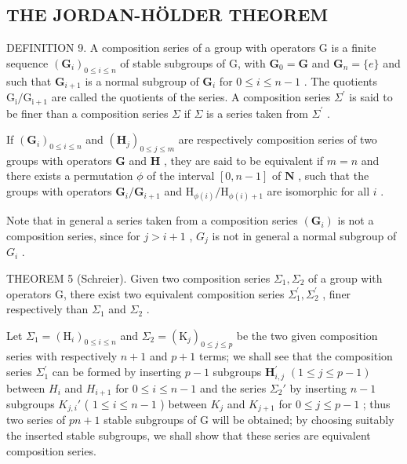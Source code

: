 \subsection{THE JORDAN-HÖLDER THEOREM}

DEFINITION 9. A composition series of a group with operators G is a finite sequence \((\mathbf{G}_i)_{0\leqslant i\leqslant n}\) of stable subgroups of G, with \(\mathbf{G}_0 = \mathbf{G}\) and \(\mathbf{G}_n = \{e\}\) and such that \(\mathbf{G}_{i + 1}\) is a normal subgroup of \(\mathbf{G}_i\) for \(0\leqslant i\leqslant n - 1\) . The quotients \(\mathrm{G_i / G_{i + 1}}\) are called the quotients of the series. A composition series \(\Sigma^{\prime}\) is said to be finer than a composition series \(\Sigma\) if \(\Sigma\) is a series taken from \(\Sigma^{\prime}\) .

If \((\mathbf{G}_i)_{0\leqslant i\leqslant n}\) and \((\mathbf{H}_j)_{0\leqslant j\leqslant m}\) are respectively composition series of two groups with operators \(\mathbf{G}\) and \(\mathbf{H}\) , they are said to be equivalent if \(m = n\) and there exists a permutation \(\phi\) of the interval \([0,n - 1]\) of \(\mathbf{N}\) , such that the groups with operators \(\mathbf{G}_i / \mathbf{G}_{i + 1}\) and \(\mathrm{H}_{\phi (i)} / \mathrm{H}_{\phi (i) + 1}\) are isomorphic for all \(i\) .

Note that in general a series taken from a composition series \((\mathbf{G}_{i})\) is not a composition series, since for \(j > i + 1\) , \(G_{j}\) is not in general a normal subgroup of \(G_{i}\) .

THEOREM 5 (Schreier). Given two composition series \(\Sigma_{1}, \Sigma_{2}\) of a group with operators G, there exist two equivalent composition series \(\Sigma_{1}^{\prime}, \Sigma_{2}^{\prime}\) , finer respectively than \(\Sigma_{1}\) and \(\Sigma_{2}\) .

Let \(\Sigma_{1} = (\mathrm{H}_{i})_{0\leqslant i\leqslant n}\) and \(\Sigma_{2} = (\mathrm{K}_{j})_{0\leqslant j\leqslant p}\) be the two given composition series with respectively \(n + 1\) and \(p + 1\) terms; we shall see that the composition series \(\Sigma_1^\prime\) can be formed by inserting \(p - 1\) subgroups \(\mathbf{H}_{i,j}^{\prime}\) \((1 \leqslant j \leqslant p - 1)\) between \(H_{i}\) and \(H_{i+1}\) for \(0 \leqslant i \leqslant n - 1\) and the series \(\Sigma_{2}'\) by inserting \(n - 1\) subgroups \(K_{j,i}'\) ( \(1 \leqslant i \leqslant n - 1\) ) between \(K_{j}\) and \(K_{j+1}\) for \(0 \leqslant j \leqslant p - 1\) ; thus two series of \(pn + 1\) stable subgroups of G will be obtained; by choosing suitably the inserted stable subgroups, we shall show that these series are equivalent composition series.

